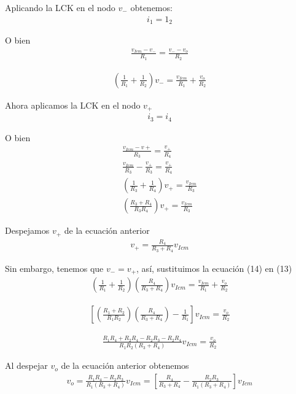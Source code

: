 \documentclass[12pt]{article}
\begin{document}
	\noindent Aplicando la LCK en el nodo $v_-$ obtenemos:
	\begin{align*}
		i_1 = 1_2
	\end{align*}
	
	\noindent O bien
	\begin{align*}
		\frac{v_{Icm}- v_-}{R_1} = \frac{v_- - v_o}{R_2}
	\end{align*}
	
	\begin{align}
		\left( \frac{1}{R_1} + \frac{1}{R_2} \right)v_- = \frac{v_{Icm}}{R_1} + \frac{v_o}{R_2}
	\end{align}
	
	\noindent Ahora aplicamos la LCK en el nodo $v_+$
	\begin{align*}
		i_3 = i_4
	\end{align*}
	
	\noindent O bien
	\begin{align*}
		\frac{v_{Icm}- v+}{R_3} = \frac{v_+}{R_4}\\
		\frac{v_{Icm}}{R_3} - \frac{v_+}{R_3} = \frac{v_+}{R_4}\\
		\left( \frac{1}{R_3} + \frac{1}{R_4} \right)v_+ = \frac{v_{Icm}}{R_3}\\
		\left( \frac{R_3 + R_4}{R_3R_4} \right)v_+ = \frac{v_{Icm}}{R_3}
	\end{align*}
	
	\noindent Despejamos $v_+$ de la ecuación anterior
	\begin{align}
		v_+ = \frac{R_4}{R_3 + R_4}v_{Icm}
	\end{align}
	
	\noindent Sin embargo, tenemos que $v_- = v_+$, así, sustituimos la ecuación (14) en (13)
	\begin{align}
		\left( \frac{1}{R_1} + \frac{1}{R_2} \right) \left( \frac{R_4}{R_3 + R_4} \right)v_{Icm} = \frac{v_{Icm}}{R_1} + \frac{v_o}{R_2}\nonumber
	\end{align}
	
	\begin{align}
		\left[ \left( \frac{R_1 + R_2}{R_1R_2} \right)\left( \frac{R_4}{R_3 + R_4} \right) - \frac{1}{R_1} \right]v_{Icm} = \frac{v_o}{R_2}\nonumber
	\end{align}  
	
	\begin{align}
		\frac{R_1R_4 + R_2R_4 - R_2R_3 - R_2R_4}{R_1R_2(R_3 + R_4)}v_{Icm} = \frac{v_o}{R_2}\nonumber
	\end{align}

	\noindent Al despejar $v_o$ de la ecuación anterior obtenemos	
	\begin{align}
		v_o = \frac{R_1R_4 - R_2R_3}{R_1(R_3 + R_4)}v_{Icm} = \left[ \frac{R_4}{R_3 + R_4} - \frac{R_2R_3}{R_1(R_3 + R_4)} \right]v_{Icm}
	\end{align}
	
\end{document}
